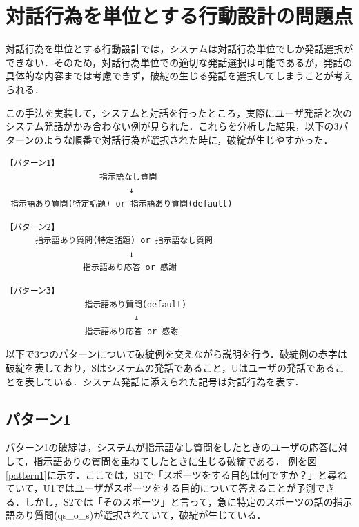 \documentclass[12pt,a4paper,twoside,openany]{jbook}
\begin{document}
\section{対話行為を単位とする行動設計の問題点}\label{bunseki}
対話行為を単位とする行動設計では，システムは対話行為単位でしか発話選択ができない．そのため，対話行為単位での適切な発話選択は可能であるが，発話の具体的な内容までは考慮できず，破綻の生じる発話を選択してしまうことが考えられる．

この手法を実装して，システムと対話を行ったところ，実際にユーザ発話と次のシステム発話がかみ合わない例が見られた．これらを分析した結果，以下の3パターンのような順番で対話行為が選択された時に，破綻が生じやすかった．
\begin{screen}
\begin{verbatim}
【パターン1】
                   指示語なし質問 
                         ↓
 指示語あり質問(特定話題) or 指示語あり質問(default)
\end{verbatim}
\end{screen}
\begin{screen}
\begin{verbatim}
【パターン2】
      指示語あり質問(特定話題) or 指示語なし質問 
                         ↓
        　      指示語あり応答 or 感謝
\end{verbatim}
\end{screen}
\begin{screen}
\begin{verbatim}
【パターン3】
                指示語あり質問(default)
                          ↓
                指示語あり応答 or 感謝
\end{verbatim}
\end{screen}

以下で3つのパターンについて破綻例を交えながら説明を行う．破綻例の赤字は破綻を表しており，Sはシステムの発話であること，Uはユーザの発話であることを表している．システム発話に添えられた記号は対話行為を表す．
\subsection*{パターン1}%


パターン1の破綻は，システムが指示語なし質問をしたときのユーザの応答に対して，指示語ありの質問を重ねてしたときに生じる破綻である．
例を図\ref{pattern1}に示す．ここでは，S1で「スポーツをする目的は何ですか？」と尋ねていて，U1ではユーザがスポーツをする目的について答えることが予測できる．しかし，S2では「そのスポーツ」と言って，急に特定のスポーツの話の指示語あり質問(qs\_o\_s)が選択されていて，破綻が生じている．
\end{document}
